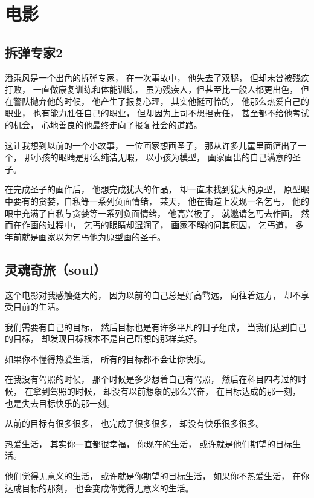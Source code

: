 
\chapter{电影}

\section{拆弹专家2}

潘乘风是一个出色的拆弹专家，
在一次事故中，
他失去了双腿，
但却未曾被残疾打败，
一直做康复训练和体能训练，
虽为残疾人，但甚至比一般人都更出色，
但在警队抛弃他的时候，
他产生了报复心理，
其实他挺可怜的，
他那么热爱自己的职业，
也有能力胜任自己的职业，
但却因为上司不想担责任，
甚至都不给他考试的机会，
心地善良的他最终走向了报复社会的道路。

这让我想到以前的一个小故事，
一位画家想画圣子，
那从许多儿童里面筛出了一个，
那小孩的眼睛是那么纯洁无暇，
以小孩为模型，
画家画出的自己满意的圣子。

在完成圣子的画作后，
他想完成犹大的作品，
却一直未找到犹大的原型，
原型眼中要有的贪婪，自私等一系列负面情绪，
某天，
他在街道上发现一名乞丐，
他的眼中充满了自私与贪婪等一系列负面情绪，
他高兴极了，
就邀请乞丐去作画，
然而在作画的过程中，
乞丐的眼睛却湿润了，
画家不解的问其原因，
乞丐道，
多年前就是画家以为乞丐他为原型画的圣子。


\section{灵魂奇旅（soul）}

这个电影对我感触挺大的，
因为以前的自己总是好高骛远，
向往着远方，
却不享受目前的生活。

我们需要有自己的目标，
然后目标也是有许多平凡的日子组成，
当我们达到自己的目标，
却发现目标根本不是自己所想的那样美好。


如果你不懂得热爱生活，
所有的目标都不会让你快乐。


在我没有驾照的时候，
那个时候是多少想着自己有驾照，
然后在科目四考过的时候，
在拿到驾照的时候，
却没有以前想象的那么兴奋，
在目标达成的那一刻，
也是失去目标快乐的那一刻。


从前的目标有很多很多，
也完成了很多很多，
却没有快乐很多很多。


热爱生活，
其实你一直都很幸福，
你现在的生活，
或许就是他们期望的目标生活。


他们觉得无意义的生活，
或许就是你期望的目标生活，
如果你不热爱生活，
在你达成目标的那刻，
也会变成你觉得无意义的生活。







